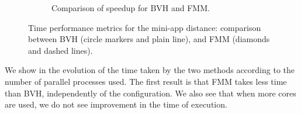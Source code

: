 \begin{figure}
\begin{subfigure}{0.49\textwidth}
    \caption{Comparison of speedup for BVH and FMM. }
    \label{fig:app:feelpp-distance:results:speedup}
    \vspace{0.8\baselineskip}
  \end{subfigure}
  \caption{Time performance metrics for the mini-app distance: comparison between BVH (circle markers and plain line), and FMM (diamonds and dashed lines).}
\end{figure}

We show in  the evolution of the time taken by the two methods according to the number of parallel processes used.
The first result is that FMM takes less time than BVH, independently of the configuration.
We also see that when more cores are used, we do not see improvement in the time of execution.

